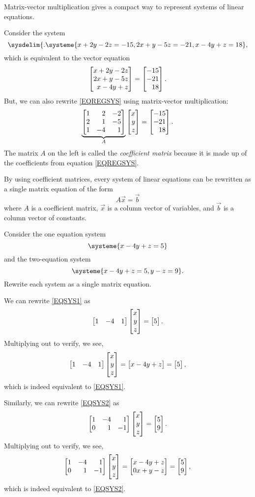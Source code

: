 Matrix-vector multiplication gives a compact way to represent systems of linear equations.

Consider the system
\begin{equation}
	\label{EQREGSYS}
	\sysdelim\{.
		\systeme{
			x+2y-2z=-15,
			2x+y-5z=-21,
			x-4y+z=18
		},
\end{equation}
which is equivalent to the vector equation
\[
	\mat{x+2y-2z\\
           2x+y-5z\\
	     x-4y+z}=\mat{-15\\-21\\18}.
\]
But, we can also rewrite \eqref{EQREGSYS} using matrix-vector multiplication:
\[
	\underbrace{\mat{1&2&-2\\2&1&-5\\1&-4&1}}_{A}\mat{x\\y\\z}=\mat{-15\\-21\\18}.
\]
The matrix $A$ on the left is called the \emph{coefficient matrix} because it
is made up of the coefficients from equation \eqref{EQREGSYS}.

By using coefficient matrices, every system of linear equations can be rewritten as a single matrix equation
of the form
\[
	A\vec x=\vec b
\]
where $A$ is a coefficient matrix, $\vec x$ is a column vector of variables, and $\vec b$ 
is a column vector of constants.

\begin{example}
	Consider the one equation system
	\begin{equation}
		\label{EQSYS1}
		\systeme{x-4y+z=5}
	\end{equation}
	and the two-equation system
	\begin{equation}
		\label{EQSYS2}
		\systeme{x-4y+z=5, y-z=9}.
	\end{equation}
	Rewrite each system as a single matrix equation.

	We can rewrite \eqref{EQSYS1} as 
	\[
        \mat{1&-4&1}\mat{x\\y\\z}=\mat{5}.
    \]
    Multiplying out to verify, we see,
    \[
        \mat{1&-4&1}\mat{x\\y\\z}=\mat{x-4y+z}=\mat{5},
    \]
    which is indeed equivalent to \eqref{EQSYS1}.
    
	Similarly, we can rewrite \eqref{EQSYS2} as 
	\[
       \mat{1&-4&1\\0&1&-1}\mat{x\\y\\z}=\mat{5\\9}.
    \]
    Multiplying out to verify, we see,
    \[
       \mat{1&-4&1\\0&1&-1}\mat{x\\y\\z}=\mat{x-4y+z\\0x+y-z}=\mat{5\\9},
    \]
    which is indeed equivalent to \eqref{EQSYS2}.
\end{example}

